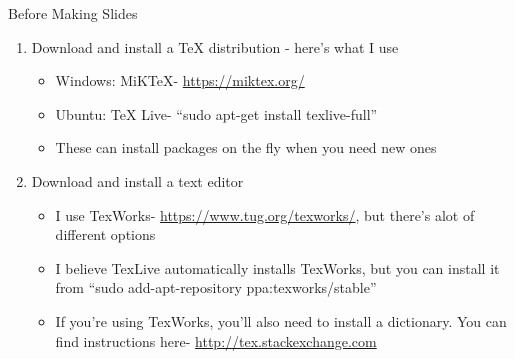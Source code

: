 \documentclass[11pt,mathserif]{beamer} %
\begin{document}
\begin{frame}[t]{Before Making Slides} %
	\begin{enumerate} %
		\item Download and install a TeX distribution - here's what I use %
		\begin{itemize} %
			\item Windows: MiKTeX- \url{https://miktex.org/} %
			\item Ubuntu: TeX Live- ``sudo apt-get install texlive-full''
\vspace{12pt} %
			\item These can install packages on the fly when you need new ones
		\end{itemize}
		
\vspace{24pt} %
		\item Download and install a text editor %
		\begin{itemize} %
			\item I use TexWorks- \url{https://www.tug.org/texworks/}, but there's alot of different options %
			\item I believe TexLive automatically installs TexWorks, but you can install it from ``sudo add-apt-repository ppa:texworks/stable''
\vspace{0.1in} %
			\item If you're using TexWorks, you'll also need to install a dictionary.  You can find instructions here- \href{http://tex.stackexchange.com/questions/235313/how-to-add-spell-checker-to-texworks-on-windows}{http://tex.stackexchange.com} %
		\end{itemize}
	\end{enumerate}
\end{frame}
\end{document}
